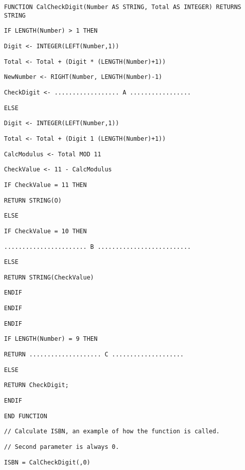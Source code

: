 \noindent %
\noindent\begin{minipage}[t]{1\columnwidth}%
\texttt{FUNCTION CalCheckDigit(Number AS STRING, Total AS INTEGER)
RETURNS STRING }

\texttt{\qquad{}IF LENGTH(Number) > 1 THEN }

\texttt{\qquad{}\qquad{}Digit <- INTEGER(LEFT(Number,1)) }

\texttt{\qquad{}\qquad{}Total <- Total + (Digit {*} (LENGTH(Number)+1)) }

\texttt{\qquad{}\qquad{}NewNumber <- RIGHT(Number, LENGTH(Number)-1) }

\texttt{\qquad{}\qquad{}CheckDigit <- .................. A ................. }

\texttt{\qquad{}ELSE }

\texttt{\qquad{}\qquad{}Digit <- INTEGER(LEFT(Number,1)) }

\texttt{\qquad{}\qquad{}Total <- Total + (Digit 1 (LENGTH(Number)+1)) }

\texttt{\qquad{}\qquad{}CalcModulus <- Total MOD 11 }

\texttt{\qquad{}\qquad{}CheckValue <- 11 - CalcModulus }

\texttt{\qquad{}\qquad{}IF CheckValue = 11 THEN }

\texttt{\qquad{}\qquad{}\qquad{}RETURN STRING(O) }

\texttt{\qquad{}\qquad{}ELSE }

\texttt{\qquad{}\qquad{}\qquad{}IF CheckValue = 10 THEN }

\texttt{\qquad{}\qquad{}\qquad{}....................... B .......................... }

\texttt{\qquad{}\qquad{}\qquad{}ELSE }

\texttt{\qquad{}\qquad{}\qquad{}RETURN STRING(CheckValue) }

\texttt{\qquad{}\qquad{}\qquad{}ENDIF }

\texttt{\qquad{}\qquad{}ENDIF }

\texttt{\qquad{}ENDIF }

\texttt{\qquad{}IF LENGTH(Number) = 9 THEN }

\texttt{\qquad{}\qquad{}RETURN .................... C .................... }

\texttt{\qquad{}ELSE }

\texttt{\qquad{}\qquad{}RETURN CheckDigit; }

\texttt{\qquad{}ENDIF }

\texttt{END FUNCTION}

\bigskip{}

\texttt{// Calculate ISBN, an example of how the function is called. }

\texttt{// Second parameter is always 0. }

\texttt{ISBN = CalCheckDigit(\textquotedbl ,0)}%
\end{minipage}

